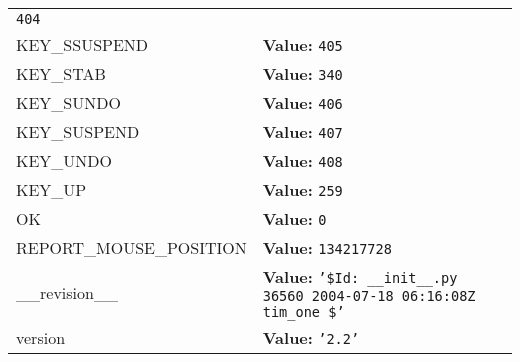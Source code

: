 \begin{longtable}{|p{}|p{}|l}
{\tt 404}&\\
\cline{1-2}
\raggedright K\-E\-Y\-\_\-S\-S\-U\-S\-P\-E\-N\-D\- & \raggedright \textbf{Value:} 
{\tt 405}&\\
\cline{1-2}
\raggedright K\-E\-Y\-\_\-S\-T\-A\-B\- & \raggedright \textbf{Value:} 
{\tt 340}&\\
\cline{1-2}
\raggedright K\-E\-Y\-\_\-S\-U\-N\-D\-O\- & \raggedright \textbf{Value:} 
{\tt 406}&\\
\cline{1-2}
\raggedright K\-E\-Y\-\_\-S\-U\-S\-P\-E\-N\-D\- & \raggedright \textbf{Value:} 
{\tt 407}&\\
\cline{1-2}
\raggedright K\-E\-Y\-\_\-U\-N\-D\-O\- & \raggedright \textbf{Value:} 
{\tt 408}&\\
\cline{1-2}
\raggedright K\-E\-Y\-\_\-U\-P\- & \raggedright \textbf{Value:} 
{\tt 259}&\\
\cline{1-2}
\raggedright O\-K\- & \raggedright \textbf{Value:} 
{\tt 0}&\\
\cline{1-2}
\raggedright R\-E\-P\-O\-R\-T\-\_\-M\-O\-U\-S\-E\-\_\-P\-O\-S\-I\-T\-I\-O\-N\- & \raggedright \textbf{Value:} 
{\tt 134217728}&\\
\cline{1-2}
\raggedright \_\-\_\-r\-e\-v\-i\-s\-i\-o\-n\-\_\-\_\- & \raggedright \textbf{Value:} 
{\tt \texttt{'}\texttt{\$Id: \_\_init\_\_.py 36560 2004-07-18 06:16:08Z tim\_one \$}\texttt{'}}&\\
\cline{1-2}
\raggedright v\-e\-r\-s\-i\-o\-n\- & \raggedright \textbf{Value:} 
{\tt \texttt{'}\texttt{2.2}\texttt{'}}&\\
\cline{1-2}
\end{longtable}

